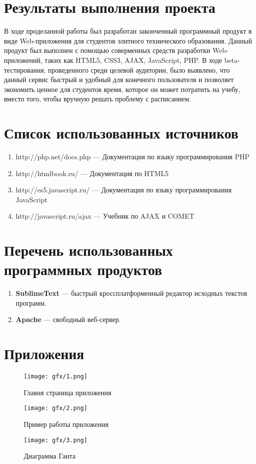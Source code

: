 \documentclass[14pt,a4paper]{report}
\makeatletter
\newif\if@prechapterused
\let\oldchapter\chapter
\renewcommand{\chapter}[1]
{
\if@prechapterused\vspace{-2em}\@prechapterusedfalse\fi
\begingroup
	\let\clearpage\relax
	\let\cleardoublepage\relax
	\oldchapter{#1}
\endgroup
}
\makeatother
\begin{document}
\chapter{Результаты выполнения проекта}

В ходе проделанной работы был разработан законченный программный продукт в 
виде Web-приложения для студентов элитного технического образования. Данный 
продукт был выполнен с помощью соверменных средств разработки Web-приложений, 
таких как HTML5, CSS3, AJAX, JavaScript, PHP. В ходе beta-тестирования, 
проведенного 
среди целевой аудитории, было выявлено, что данный сервис быстрый и удобный 
для конечного пользователя и позволяет экономить ценное для студентов время, 
которое он может потратить на учебу, вместо того, чтобы вручную решать 
проблему с расписанием.

\chapter{Список использованных источников}

\begin{enumerate}
  \item http://php.net/docs.php --- Документация по языку программирования PHP
  \item http://htmlbook.ru/ --- Документация по HTML5
  \item http://es5.javascript.ru/ --- Документация по языку программирования 
  JavaScript
  \item http://javascript.ru/ajax --- Учебник по AJAX и COMET
\end{enumerate}

\chapter{Перечень использованных программных продуктов}

\begin{enumerate}
  \item \textbf{SublimeText} --- быстрый кроссплатформенный редактор исходных 
  текстов программ.
  \item \textbf{Apache} --- свободный веб-сервер.
\end{enumerate}

\newpage
\chapter{Приложения}

\begin{figure}[H]
\centerline{\texttt{[image: gfx/1.png]}}
\caption{Главня страница приложения}
\label{fig1}
\end{figure}

\begin{figure}[H]
\centerline{\texttt{[image: gfx/2.png]}}
\caption{Пример работы приложения}
\label{fig2}
\end{figure}

\begin{figure}[H]
\centerline{\texttt{[image: gfx/3.png]}}
\caption{Диаграмма Ганта}
\label{fig3}
\end{figure}
\end{document}

